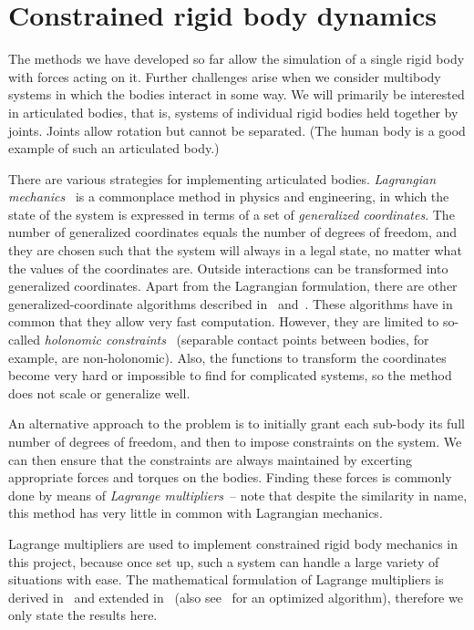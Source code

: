\section{Constrained rigid body dynamics\label{constraints}}
The methods we have developed so far allow the simulation of a single rigid body with forces
acting on it. Further challenges arise when we consider multibody systems in which the bodies
interact in some way. We will primarily be interested in articulated bodies, that is, systems
of individual rigid bodies held together by joints. Joints allow rotation but cannot be
separated. (The human body is a good example of such an articulated body.)

There are various strategies for implementing articulated bodies. \emph{Lagrangian
mechanics}~\cite{Hand:98,Goldstein:80} is a commonplace method in physics and engineering, in
which the state of the system is expressed in terms of a set of \emph{generalized coordinates}.
The number of generalized coordinates equals the number of degrees of freedom, and they are
chosen such that the system will always in a legal state, no matter what the values of the
coordinates are. Outside interactions can be transformed into generalized coordinates. Apart
from the Lagrangian formulation, there are other generalized-coordinate algorithms described
in~\cite{Wilhelms:91} and~\cite{Featherstone:87}. These algorithms have in common that they
allow very fast computation. However, they are limited to so-called \emph{holonomic
constraints}~\cite{Hand:98} (separable contact points between bodies, for example, are
non-holonomic). Also, the functions to transform the coordinates become very hard or
impossible to find for complicated systems, so the method does not scale or generalize well.

An alternative approach to the problem is to initially grant each sub-body its full number of
degrees of freedom, and then to impose constraints on the system. We can then ensure that the
constraints are always maintained by excerting appropriate forces and torques on the bodies.
Finding these forces is commonly done by means of \emph{Lagrange multipliers}~-- note that
despite the similarity in name, this method has very little in common with Lagrangian mechanics.

Lagrange multipliers are used to implement constrained rigid body mechanics in this project,
because once set up, such a system can handle a large variety of situations with ease.
The mathematical formulation of Lagrange multipliers is derived in~\cite{BaraffWitkin:97} and
extended in~\cite{Saunders:PhD} (also see~\cite{Baraff:96} for an optimized algorithm),
therefore we only state the results here.

